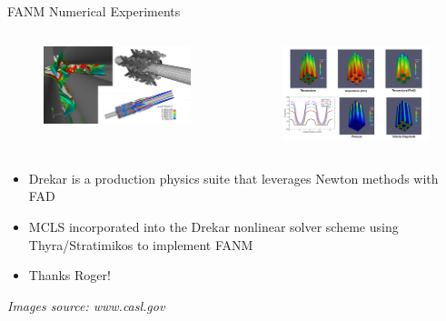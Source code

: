 \documentclass{beamer}
\begin{document}
\begin{frame}{FANM Numerical Experiments}

  \begin{columns}
    \begin{column}{0.5\textwidth}
      \begin{figure}[htpb!]
        \begin{center}
          \includegraphics[width=2.5in]{drekar1.png}
        \end{center}
      \end{figure}
    \end{column}

    \begin{column}{0.5\textwidth}
      \begin{figure}[htpb!]
        \begin{center}
          \includegraphics[width=2.5in]{drekar2.png}
        \end{center}
      \end{figure}
    \end{column}
  \end{columns}

  \bigskip

  \begin{itemize}
  \item Drekar is a production physics suite that leverages Newton
    methods with FAD
  \item MCLS incorporated into the Drekar nonlinear solver scheme
    using Thyra/Stratimikos to implement FANM
  \item Thanks Roger!
  \end{itemize}

  {\small \sl Images source: www.casl.gov}

\end{frame}
\end{document}
